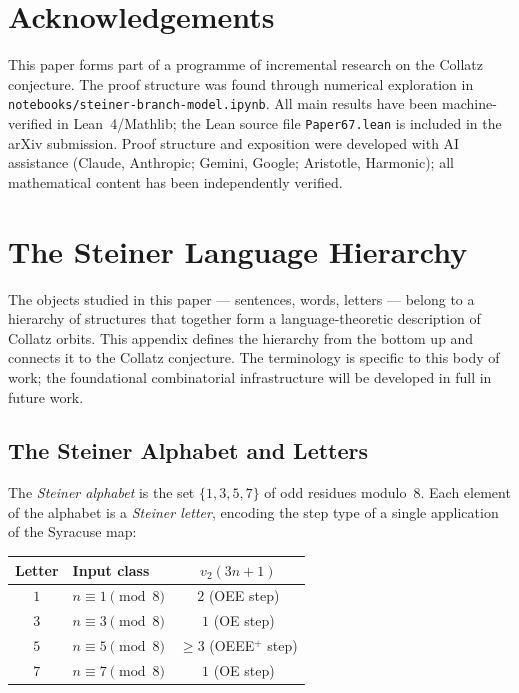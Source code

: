 \documentclass[12pt]{article}
\theoremstyle{definition}
\theoremstyle{remark}
\begin{document}
\section*{Acknowledgements}

This paper forms part of a programme of incremental research on the Collatz conjecture. The proof structure was found through
numerical exploration in \texttt{notebooks/steiner-branch-model.ipynb}.
All main results have been machine-verified in Lean~4/Mathlib; the Lean source
file \texttt{Paper67.lean} is included in the arXiv submission.
Proof structure and exposition were developed with AI assistance (Claude,
Anthropic; Gemini, Google; Aristotle, Harmonic); all mathematical content
has been independently verified.

\appendix
{}

\section{The Steiner Language Hierarchy}
\label{app:hierarchy}

The objects studied in this paper — sentences, words, letters — belong to a
hierarchy of structures that together form a language-theoretic description of
Collatz orbits.
This appendix defines the hierarchy from the bottom up and connects it to the
Collatz conjecture.
The terminology is specific to this body of work; the foundational combinatorial
infrastructure will be developed in full in future work.

\subsection*{The Steiner Alphabet and Letters}

The \emph{Steiner alphabet} is the set $\{1, 3, 5, 7\}$ of odd residues
modulo~8.
Each element of the alphabet is a \emph{Steiner letter}, encoding the step type
of a single application of the Syracuse map:

\begin{center}
\begin{tabular}{c|l|c}
\toprule
Letter & Input class & $v_2(3n+1)$ \\
\midrule
$1$ & $n \equiv 1 \pmod{8}$ & $2$ (OEE step) \\
$3$ & $n \equiv 3 \pmod{8}$ & $1$ (OE step) \\
$5$ & $n \equiv 5 \pmod{8}$ & $\geq 3$ (OEEE$^+$ step) \\
$7$ & $n \equiv 7 \pmod{8}$ & $1$ (OE step) \\
\bottomrule
\end{tabular}
\end{center}
\end{document}
